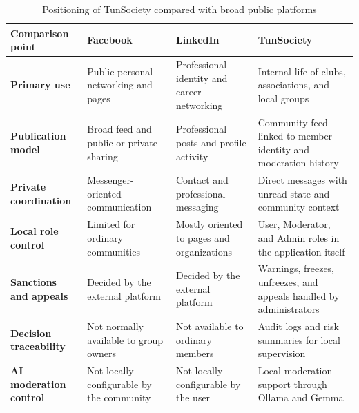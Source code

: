 \begin{table}[H]
\centering
\begin{tabular}{|>{\bfseries}m{3.4cm}|m{3.2cm}|m{3.2cm}|m{3.8cm}|}
\hline
Comparison point & Facebook & LinkedIn & TunSociety \\
\hline
Primary use & Public personal networking and pages & Professional identity and career networking & Internal life of clubs, associations, and local groups \\
\hline
Publication model & Broad feed and public or private sharing & Professional posts and profile activity & Community feed linked to member identity and moderation history \\
\hline
Private coordination & Messenger-oriented communication & Contact and professional messaging & Direct messages with unread state and community context \\
\hline
Local role control & Limited for ordinary communities & Mostly oriented to pages and organizations & User, Moderator, and Admin roles in the application itself \\
\hline
Sanctions and appeals & Decided by the external platform & Decided by the external platform & Warnings, freezes, unfreezes, and appeals handled by administrators \\
\hline
Decision traceability & Not normally available to group owners & Not available to ordinary members & Audit logs and risk summaries for local supervision \\
\hline
AI moderation control & Not locally configurable by the community & Not locally configurable by the user & Local moderation support through Ollama and Gemma \\
\hline
\end{tabular}
\caption{Positioning of TunSociety compared with broad public platforms}
\end{table}
